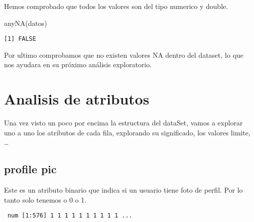 \documentclass[
  letterpaper,
  DIV=11,
  numbers=noendperiod]{scrreprt}
\newenvironment{Shaded}{\begin{snugshade}}{\end{snugshade}}
\newcommand{\AttributeTok}[1]{\textcolor[rgb]{0.40,0.45,0.13}{#1}}
\newcommand{\FunctionTok}[1]{\textcolor[rgb]{0.28,0.35,0.67}{#1}}
\newcommand{\NormalTok}[1]{\textcolor[rgb]{0.00,0.23,0.31}{#1}}
\newcommand{\SpecialCharTok}[1]{\textcolor[rgb]{0.37,0.37,0.37}{#1}}
\newcommand{\StringTok}[1]{\textcolor[rgb]{0.13,0.47,0.30}{#1}}
\begin{document}
Hemos comprobado que todos los valores son del tipo numerico y double.

\begin{Shaded}
\begin{Highlighting}[]
\FunctionTok{anyNA}\NormalTok{(datos)}
\end{Highlighting}
\end{Shaded}

\begin{verbatim}
[1] FALSE
\end{verbatim}

Por ultimo comprobamos que no existen valores NA dentro del dataset, lo
que nos ayudara en su próximo análisis exploratorio.

\section{Analisis de atributos}\label{analisis-de-atributos}

Una vez visto un poco por encima la estructura del dataSet, vamos a
explorar uno a uno los atributos de cada fila, explorando su
significado, los valores limite, \ldots{}

\subsection{profile pic}\label{profile-pic}

Este es un atributo binario que indica si un usuario tiene foto de
perfil. Por lo tanto solo tenemos o 0 o 1.

\begin{Shaded}
\end{Shaded}

\begin{verbatim}
 num [1:576] 1 1 1 1 1 1 1 1 1 1 ...
\end{verbatim}

\begin{Shaded}
\end{Shaded}
\end{document}
